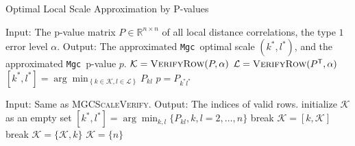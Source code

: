 \documentclass[11pt]{article}
\providecommand{\sct}[1]{{\sc \texttt{#1}}}
\newcommand{\Real}{\mathbb{R}}
\newcommand{\K}{\mathcal{K}}
\newcommand{\LL}{\mathcal{L}}
\newcommand{\T}{^{\ensuremath{\mathsf{T}}}}           %
\newcommand{\Mgc}{\sct{Mgc}}
\begin{document}
\begin{algorithm}
\caption{Optimal Local Scale Approximation by P-values}
\label{alg:best_scale}
\begin{algorithmic}[1]
\Statex Input: The p-value matrix $P \in \Real^{n \times n}$ of all local distance correlations, the type $1$ error level $\alpha$.
\Statex Output: The approximated \Mgc~optimal scale $(k^{*},l^{*})$, and the approximated \Mgc~p-value $p$.
\State $\K=\textsc{VerifyRow}(P,\alpha)$ 
\State $\LL=\textsc{VerifyRow}(P\T,\alpha)$ 
\State $[k^{*},l^{*}]=\arg\min_{\left\{k \in \K, l \in \LL\right\}} P_{kl}$ 
\State $p=P_{k^{*}l^{*}}$
\EndFunction
\end{algorithmic}

\begin{algorithmic}[1]
\Statex
\Statex Input: Same as \textsc{MGCScaleVerify}.
\Statex Output: The indices of valid rows.
\State initialize $\K$ as an empty set
\State $[k^{*},l^{*}]=\arg\min_{k, l} \{P_{kl},k,l=2,\ldots,n\}$
 
\State break
\EndIf
\State $\K=[k,\K]$
\EndFor
{} 
\State break
\EndIf
\State $\K=\{\K,k\}$
\EndFor
\If{$\textsc{Median}(P_{kl},k \in \K, l=2,\ldots,n) > \alpha * \frac{|\K|}{n-1}$}
\State $\K=\{n\}$ 
\EndIf
\EndFunction
\end{algorithmic}
\end{algorithm}
\end{document}
